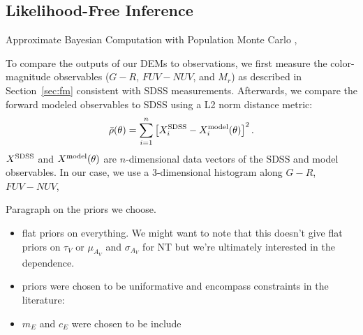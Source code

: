 \subsection{Likelihood-Free Inference} \label{sec:abc}
Approximate Bayesian Computation with Population Monte Carlo \cite{hahn2017a},

To compare the outputs of our DEMs to observations, we first measure the color-magnitude
observables ($G-R$, $FUV-NUV$, and $M_r$) as described in Section~\ref{sec:fm}
consistent with SDSS measurements. Afterwards, we compare the forward modeled
observables to SDSS using a L2 norm distance metric: 
\begin{equation}
    \bar{\rho}(\theta) = \sum\limits_{i=1}^{n} \left[X^{\rm SDSS}_i - X^{\rm model}_i(\theta) \right]^2.
\end{equation}
$X^{\rm SDSS}$ and $X^{\rm model}(\theta)$ are $n$-dimensional data vectors of
the SDSS and model observables. In our case, we use a 3-dimensional histogram
along $G-R$, $FUV-NUV$, 

\cite{ishida2015} 

Paragraph on the priors we choose. 
\begin{itemize}
    \item flat priors on everything. We might want to note that this doesn't
        give flat priors on $\tau_V$ or $\mu_{A_V}$ and $\sigma_{A_V}$ for NT
        but we're ultimately interested in the dependence. 
    \item priors were chosen to be uniformative and encompass constraints in
        the literature:
    \item $m_E$ and $c_E$ were chosen to be include \cite{kriek2013, narayanan2018, tress2018} 
\end{itemize}


